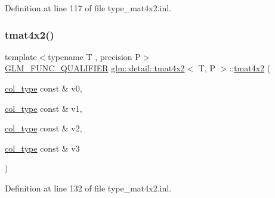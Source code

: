 Definition at line 117 of file type\+\_\+mat4x2.\+inl.

\mbox{\label{structglm_1_1detail_1_1tmat4x2_a5e5749116ce86b6d1d0bd43d6c2158b0}} 
\subsubsection{\texorpdfstring{tmat4x2()}{tmat4x2()}\hspace{0.1cm}{\footnotesize\ttfamily [7/22]}}
{\footnotesize\ttfamily template$<$typename T , precision P$>$ \\
\hyperlink{setup_8hpp_a33fdea6f91c5f834105f7415e2a64407}{G\+L\+M\+\_\+\+F\+U\+N\+C\+\_\+\+Q\+U\+A\+L\+I\+F\+I\+ER} \hyperlink{structglm_1_1detail_1_1tmat4x2}{glm\+::detail\+::tmat4x2}$<$ T, P $>$\+::\hyperlink{structglm_1_1detail_1_1tmat4x2}{tmat4x2} (\begin{DoxyParamCaption}\item[{\hyperlink{structglm_1_1detail_1_1tmat4x2_a7ff0997d9fa4f93eba8a6530ca2cd3f7}{col\+\_\+type} const \&}]{v0,  }\item[{\hyperlink{structglm_1_1detail_1_1tmat4x2_a7ff0997d9fa4f93eba8a6530ca2cd3f7}{col\+\_\+type} const \&}]{v1,  }\item[{\hyperlink{structglm_1_1detail_1_1tmat4x2_a7ff0997d9fa4f93eba8a6530ca2cd3f7}{col\+\_\+type} const \&}]{v2,  }\item[{\hyperlink{structglm_1_1detail_1_1tmat4x2_a7ff0997d9fa4f93eba8a6530ca2cd3f7}{col\+\_\+type} const \&}]{v3 }\end{DoxyParamCaption})}



Definition at line 132 of file type\+\_\+mat4x2.\+inl.

\mbox{\label{structglm_1_1detail_1_1tmat4x2_a7999df24927e0ce901b39f396c529692}} 
